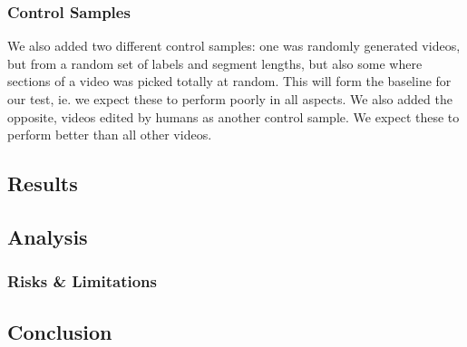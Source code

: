 \subsubsection{Control Samples}
%
We also added two different control samples: one was randomly generated videos, but from a random set of labels and segment lengths, but also some where sections of a video was picked totally at random. This will form the baseline for our test, ie. we expect these to perform poorly in all aspects. We also added the opposite, videos edited by humans as another control sample. We expect these to perform better than all other videos.
%
\subsection{Results}
%

%
\subsection{Analysis}
%

%
\subsubsection{Risks \& Limitations}
%


%
\subsection{Conclusion}
%